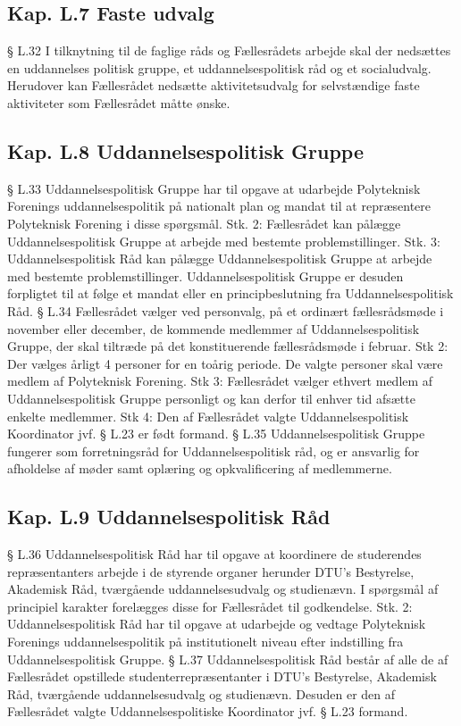\begin{list}
\subsection{Kap. L.7 Faste udvalg}
§ L.32
I tilknytning til de faglige råds og Fællesrådets arbejde skal der nedsættes en uddannelses politisk gruppe, et
uddannelsespolitisk råd og et socialudvalg. Herudover kan Fællesrådet nedsætte aktivitetsudvalg for
selvstændige faste aktiviteter som Fællesrådet måtte ønske.
\subsection{Kap. L.8 Uddannelsespolitisk Gruppe}
§ L.33
Uddannelsespolitisk Gruppe har til opgave at udarbejde Polyteknisk Forenings uddannelsespolitik på
nationalt plan og mandat til at repræsentere Polyteknisk Forening i disse spørgsmål.
Stk. 2: Fællesrådet kan pålægge Uddannelsespolitisk Gruppe at arbejde med bestemte problemstillinger.
Stk. 3: Uddannelsespolitisk Råd kan pålægge Uddannelsespolitisk Gruppe at arbejde med bestemte
problemstillinger. Uddannelsespolitisk Gruppe er desuden forpligtet til at følge et mandat eller en
principbeslutning fra Uddannelsespolitisk Råd.
§ L.34
Fællesrådet vælger ved personvalg, på et ordinært fællesrådsmøde i november eller december, de kommende
medlemmer af Uddannelsespolitisk Gruppe, der skal tiltræde på det konstituerende fællesrådsmøde i februar.
Stk 2: Der vælges årligt 4 personer for en toårig periode. De valgte personer skal være medlem af
Polyteknisk Forening.
Stk 3: Fællesrådet vælger ethvert medlem af Uddannelsespolitisk Gruppe personligt og kan derfor til enhver
tid afsætte enkelte medlemmer.
Stk 4: Den af Fællesrådet valgte Uddannelsespolitisk Koordinator jvf. § L.23 er født formand.
§ L.35
Uddannelsespolitisk Gruppe fungerer som forretningsråd for Uddannelsespolitisk råd, og er ansvarlig for
afholdelse af møder samt oplæring og opkvalificering af medlemmerne.
\subsection{Kap. L.9 Uddannelsespolitisk Råd}
§ L.36
Uddannelsespolitisk Råd har til opgave at koordinere de studerendes repræsentanters arbejde i de styrende
organer herunder DTU’s Bestyrelse, Akademisk Råd, tværgående uddannelsesudvalg og studienævn. I
spørgsmål af principiel karakter forelægges disse for Fællesrådet til godkendelse.
Stk. 2: Uddannelsespolitisk Råd har til opgave at udarbejde og vedtage Polyteknisk Forenings
uddannelsespolitik på institutionelt niveau efter indstilling fra Uddannelsespolitisk Gruppe.
§ L.37
Uddannelsespolitisk Råd består af alle de af Fællesrådet opstillede studenterrepræsentanter i DTU’s
Bestyrelse, Akademisk Råd, tværgående uddannelsesudvalg og studienævn. Desuden er den af Fællesrådet
valgte Uddannelsespolitiske Koordinator jvf. § L.23 formand.

\end{list}
